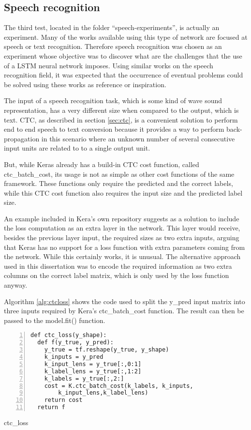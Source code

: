 \subsection{Speech recognition}
The third test, located in the folder ``speech-experiments'', is actually an experiment. Many of the works available using this type of network are focused at speech or text recognition. Therefore speech recognition was chosen as an experiment whose objective was to discover what are the challenges that the use of a LSTM neural network imposes. Using similar works on the speech recognition field, it was expected that the occurrence of eventual problems could be solved using these works as reference or inspiration.

The input of a speech recognition task, which is some kind of wave sound representation, has a very different size when compared to the output, which is text. CTC, as described in section \ref{sec:ctc}, is a convenient solution to perform end to end speech to text conversion because it provides a way to perform back-propagation in this scenario where an unknown number of several consecutive input units are related to to a single output unit.

But, while Keras already has a build-in CTC cost function, called ctc\_batch\_cost, its usage is not as simple as other cost functions of the same framework. These functions only require the predicted and the correct labels, while this CTC cost function also requires the input size and the predicted label size. 

An example included in Kera's own repository  suggests as a solution to include the loss computation as an extra layer in the network. This layer would receive, besides the previous layer input, the required sizes as two extra inputs, arguing that Keras has no support for a loss function with extra parameters coming from the network. 
While this certainly works, it is unusual. The alternative approach used in this dissertation was to encode the required information as two extra columns on the correct label matrix, which is only used by the loss function anyway.
 
Algorithm \ref{alg:ctcloss} shows the code used to split the y\_pred input matrix into three inputs required by Kera's ctc\_batch\_cost function. The result can then be passed to the model.fit() function.

\noindent
\begin{algorithm}
\begin{lstlisting}[frame=single, numbers=left]
def ctc_loss(y_shape):
  def f(y_true, y_pred):
    y_true = tf.reshape(y_true, y_shape)
    k_inputs = y_pred
    k_input_lens = y_true[:,0:1]
    k_label_lens = y_true[:,1:2]
    k_labels = y_true[:,2:]
    cost = K.ctc_batch_cost(k_labels, k_inputs,
        k_input_lens,k_label_lens)
    return cost
  return f
\end{lstlisting}
\caption{\label{alg:ctcloss}ctc\_loss}
\end{algorithm}

